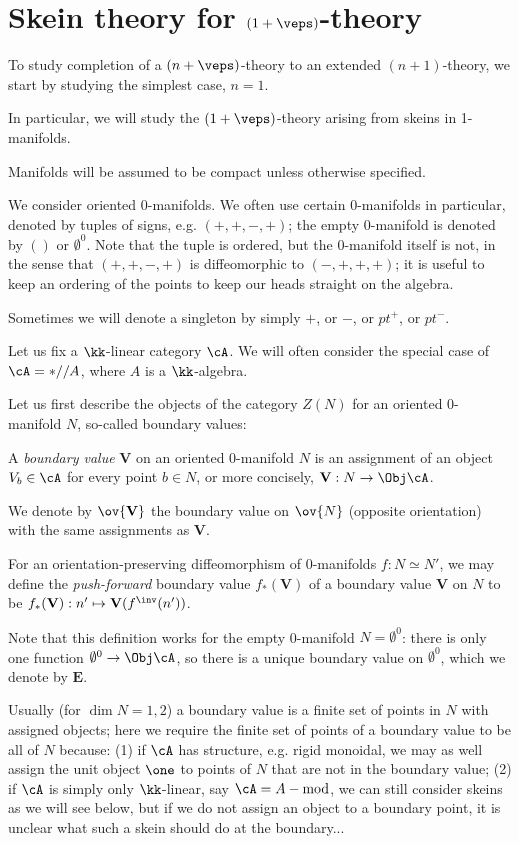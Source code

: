 \documentclass[12pt]{article}
\newcommand{\empt}[1]{{\emptyset^{#1}}}
\newcommand{\VV}{{\mathbf{V}}}
\newcommand{\EE}{{\mathbf{E}}}
\begin{document}
\section{Skein theory for $(1+\veps)$-theory}
\label{s:skeins}

To study completion of a $(n+\veps)$-theory
to an extended $(n+1)$-theory,
we start by studying the simplest case, $n = 1$.

In particular, we will study the $(1+\veps)$-theory
arising from skeins in 1-manifolds.

Manifolds will be assumed to be compact
unless otherwise specified.

We consider oriented 0-manifolds.
We often use certain 0-manifolds in particular,
denoted by tuples of signs, e.g. $(+,+,-,+)$;
the empty 0-manifold is denoted by $()$ or $\empt{0}$.
Note that the tuple is ordered, but the 0-manifold itself
is not, in the sense that
$(+,+,-,+)$ is diffeomorphic to $(-,+,+,+)$;
it is useful to keep an ordering of the points
to keep our heads straight on the algebra.

Sometimes we will denote a singleton by simply $+$,
or $-$, or $pt^+$, or $pt^-$.

Let us fix a $\kk$-linear category $\cA$.
We will often consider the special case of
$\cA = *//A$, where $A$ is a $\kk$-algebra.

Let us first describe the objects of the category
$Z(N)$ for an oriented 0-manifold $N$,
so-called boundary values:

\begin{definition}
A \emph{boundary value} $\VV$ on an oriented 0-manifold $N$
is an assignment of an object $V_b \in \cA$
for every point $b \in N$,
or more concisely, $\VV: N \to \Obj \cA$.

We denote by $\ov{\VV}$ the boundary value on $\ov{N}$
(opposite orientation) with the same assignments as $\VV$.

For an orientation-preserving diffeomorphism of 0-manifolds
$f: N \simeq N'$,
we may define the \emph{push-forward} boundary value
$f_*(\VV)$ of a boundary value $\VV$ on $N$
to be $f_*(\VV): n' \mapsto \VV(f^\inv(n'))$.
\end{definition}

Note that this definition works for the empty 0-manifold
$N = \empt{0}$: there is only one function $\empt{0} \to \Obj \cA$,
so there is a unique boundary value on $\empt{0}$,
which we denote by $\EE$.

\begin{remark}
\label{r:boundary-value}
Usually (for $\dim N = 1,2$)
a boundary value is a finite set of points in $N$
with assigned objects;
here we require the finite set of points of a boundary value
to be all of $N$ because:
(1) if $\cA$ has structure, e.g. rigid monoidal,
we may as well assign the unit object $\one$ to points
of $N$ that are not in the boundary value;
(2) if $\cA$ is simply only $\kk$-linear,
say $\cA = A-\text{mod}$,
we can still consider skeins as we will see below,
but if we do not assign an object to a boundary point,
it is unclear what such a skein should do at the boundary...
\end{remark}
\end{document}
